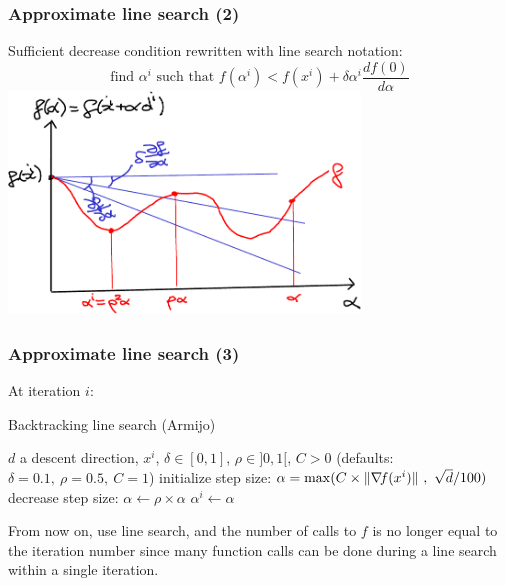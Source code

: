 \documentclass[12pt]{beamer}
\begin{document}
\begin{frame}
\frametitle{Approximate line search (2)} 
Sufficient decrease condition rewritten with line search notation:
\begin{equation*}
\text{find } \alpha^i \text{ such that } f(\alpha^i) < f(x^i) + \delta \alpha^i \frac{d f(0)}{d \alpha}
\end{equation*}
\centering
\includegraphics[width=0.7\textwidth]{line_search_backtrack-crop.pdf} 
\end{frame}

\begin{frame}
\frametitle{Approximate line search (3)} 
At iteration $i$:
\begin{block}{Backtracking line search (Armijo)}
\begin{algorithmic}
\REQUIRE $d$ a descent direction, $x^i$, $\delta \in [0,1]$, $\rho \in ]0,1[$, $C>0$
\STATE (defaults: $\delta=0.1,~\rho=0.5,~C=1$)
\STATE initialize step size: $\alpha = \max(C \times \lVert \nabla\!{f}(x^i) \rVert ~,~ \sqrt{d}/100) $ 
\STATE decrease step size: $\alpha \leftarrow \rho \times \alpha$
\ENDWHILE 
\RETURN $\alpha^i \leftarrow \alpha$
\end{algorithmic}
\end{block}
From now on, use line search, and the number of calls to $f$ is no longer equal to the iteration number since many function calls can be done during a line search within a single iteration.
\end{frame}
\end{document}
